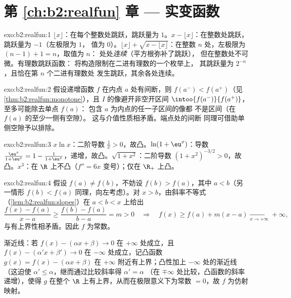 \section*{第 \ref{ch:b2:realfun} 章 --- 实变函数}

\begin{solution}{exo:b2:realfun:1}
$\lfloor x\rfloor$：在每个整数处跳跃，跳跃量为 $1$。$x -
\lfloor x\rfloor$：在整数处跳跃，跳跃量为 $-1$（左极限为 $1$，
值为 $0$）。$\lfloor x\rfloor + \sqrt{x - \lfloor x\rfloor}$：在整数
$n$ 处，左极限为 $(n - 1) + 1 = n$，取值为 $n$：
处处\emph{连续}（平方根弥补了跳跃），
但在整数处不可微。有理数跳跃函数：
将构造限制在二进有理数的一个枚举上，
其跳跃量为 $2^{-n}$，且恰在第 $n$ 个二进有理数处
发生跳跃，其余各处连续。
\end{solution}

\begin{solution}{exo:b2:realfun:2}
假设递增函数 $f$ 在内点 $a$ 处有间断，则
$f(a^-) < f(a^+)$（见\cref{thm:b2:realfun:monotone}），且
$I$ 的像避开非空开区间
$\intoo{f(a^-)}{f(a^+)}$，至多可能除去单点 $f(a)$：
包含 $a$ 为内点的任一子区间的像都
不是区间（在 $f(a)$ 的至少一侧有空隙）。
这与介值性质相矛盾。端点处的间断
同理可借助单侧空隙予以排除。
\end{solution}

\begin{solution}{exo:b2:realfun:3}
$x\ln x$：二阶导数 $\frac1x > 0$，故凸。$\ln(1 +
\eu^x)$：导数 $\frac{\eu^x}{1 + \eu^x} = 1 - \frac{1}{1 +
\eu^x}$，递增，故凸。$\sqrt{1 + x^2}$：二阶导数
$(1 + x^2)^{-3/2} > 0$，故凸。$x^3$：在 $\R$ 上不凸（$f'' =
6x$ 变号）；仅在 $\R_+$ 上凸。
\end{solution}

\begin{solution}{exo:b2:realfun:4}
假设 $f(a) \neq f(b)$，不妨设 $f(b) > f(a)$，其中 $a < b$（另一情形
$f(b) < f(a)$ 同理，向左考虑）。对 $x > b$，由斜率不等式
（\cref{lem:b2:realfun:slopes}）在 $a < b < x$ 上给出
\[
\frac{f(x) - f(a)}{x - a} \geq \frac{f(b) - f(a)}{b - a} = m > 0
\quad\Longrightarrow\quad
f(x) \geq f(a) + m(x - a) \xrightarrow[x\to+\infty]{} +\infty,
\]
与有上界性相矛盾。因此 $f$ 为常数。

渐近线：若 $f(x) - (\alpha x + \beta) \to 0$ 在 $+\infty$ 处成立，且
$f(x) - (\alpha' x + \beta') \to 0$ 在 $-\infty$ 处成立，记凸函数
$g(x) = f(x) - (\alpha x + \beta)$ 在
$+\infty$ 附近有上界；凸性加上 $-\infty$ 处的渐近线（这迫使
$\alpha' \leq \alpha$，继而通过比较斜率得 $\alpha' = \alpha$
（在 $\mp\infty$ 处比较，凸函数的斜率递增），使得 $g$
在整个 $\R$ 上有上界，从而在极限意义下为常数 $= 0$，故 $f$
为仿射映射。
\end{solution}

